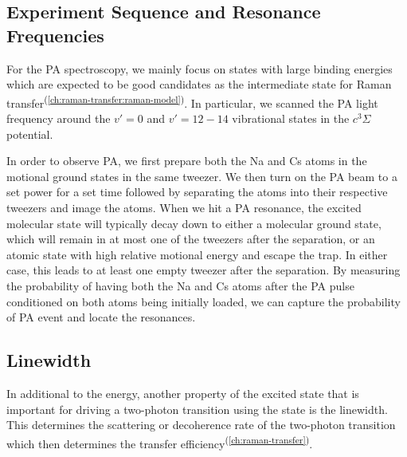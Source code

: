 \subsection{Experiment Sequence and Resonance Frequencies}
\label{pa:sequence-res}

For the PA spectroscopy, we mainly focus on states with large binding energies
which are expected to be good candidates as the intermediate state
for Raman transfer\textsuperscript{(\ref{ch:raman-transfer:raman-model})}.
In particular, we scanned the PA light frequency around the $v'=0$ and $v'=12-14$
vibrational states in the $c^3\Sigma$ potential.

In order to observe PA, we first prepare both the Na and Cs atoms in the motional ground states
in the same tweezer\cite{liu_building_2018}.
We then turn on the PA beam to a set power for a set time
followed by separating the atoms into their respective tweezers and image the atoms.
When we hit a PA resonance, the excited molecular state will typically decay down
to either a molecular ground state,
which will remain in at most one of the tweezers after the separation,
or an atomic state with high relative motional energy and escape the trap.
In either case, this leads to at least one empty tweezer after the separation.
By measuring the probability of having both the Na and Cs atoms after the PA pulse
conditioned on both atoms being initially loaded,
we can capture the probability of PA event and locate the resonances.


\subsection{Linewidth}
\label{pa:linewidth}

In additional to the energy, another property of the excited state
that is important for driving a two-photon transition using the state is the linewidth.
This determines the scattering or decoherence rate of
the two-photon transition which then determines
the transfer efficiency\textsuperscript{(\ref{ch:raman-transfer})}.

